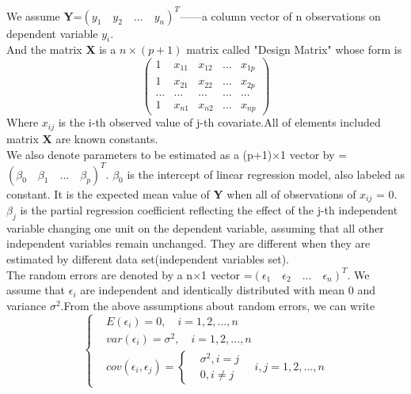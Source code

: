 \documentclass[a4paper]{article}
\begin{document}
\noindent
We assume \textbf{Y}=$(y_1 \quad y_2 \quad ... \quad y_n)^T$——a column vector of n observations on dependent variable $y_i$.  \\[4pt]
And the matrix  \textbf{X} is a $n\times(p+1)$ matrix called "Design Matrix" whose form is
$$
\left(
\begin{matrix}
1 & x_{11} & x_{12} & ... & x_{1p} \\
1 & x_{21} & x_{22} & ... & x_{2p} \\
... & ... & ... & ... & ... \\
1 & x_{n1} & x_{n2} & ... & x_{np}
\end{matrix}
\right)
$$
Where $x_{ij}$ is the i-th observed value of j-th covariate.All of elements included matrix \textbf{X} are known constants.\\[4pt]
We also denote parameters to be estimated as a (p+1)$\times$1 vector by \bm{$\beta$}=$(\beta_0 \quad \beta_1 \quad ... \quad \beta_p)^T$. $\beta_0$ is the intercept of linear regression model, also labeled as constant. It is the expected mean value of \textbf{Y} when all of observations of $x_{ij}$ = 0. $\beta_j$ is the partial regression coefficient reflecting the effect of the j-th independent variable changing one unit on the dependent variable, assuming that all other independent variables remain unchanged. They are different when they are estimated by different data set(independent variables set).\\[4pt]
The random errors are denoted by a n$\times$1 vector \bm{$\epsilon$}=$(\epsilon_1 \quad \epsilon_2 \quad ... \quad \epsilon_n)^T$. We assume that $\epsilon_i$ are independent and identically distributed with mean 0 and variance $\sigma^2$.From the above assumptions about random errors, we can write
\begin{equation*}
	\left\{
	\begin{aligned}
	  &	E(\epsilon_i)=0, \quad i=1,2,...,n \\
	  &	var(\epsilon_i)=\sigma^2,   \quad    i=1,2,...,n \\ 
	  &	cov(\epsilon_i,\epsilon_j)=
		\left\{
		\begin{aligned}
	 &	\sigma^2,    i=j \\
	 &	0,               i \neq j
		\end{aligned}
		  \quad                               i,j=1,2,...,n
		  \right.
	\end{aligned}
\right.
\end{equation*}\\
\end{document}
